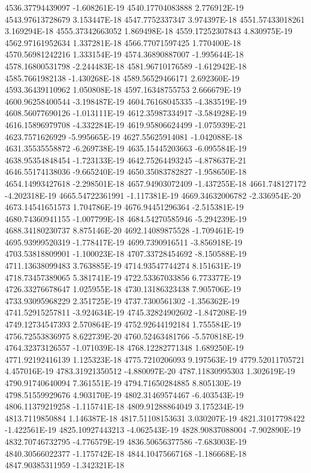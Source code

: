 4536.37794439097  -1.608261E-19
4540.17704083888  2.776912E-19
4543.97613728679  3.153447E-18
4547.7752337347  3.974397E-18
4551.57433018261  3.169294E-18
4555.37342663052  1.869498E-18
4559.17252307843  4.830975E-19
4562.97161952634  1.337281E-18
4566.77071597425  1.770400E-18
4570.56981242216  1.333154E-19
4574.36890887007  -1.995644E-18
4578.16800531798  -2.244483E-18
4581.96710176589  -1.612942E-18
4585.7661982138  -1.430268E-18
4589.56529466171  2.692360E-19
4593.36439110962  1.050808E-18
4597.16348755753  2.666679E-19
4600.96258400544  -3.198487E-19
4604.76168045335  -4.383519E-19
4608.56077690126  -1.013111E-19
4612.35987334917  -3.584928E-19
4616.15896979708  -4.332284E-19
4619.95806624499  -1.075939E-21
4623.7571626929  -5.995665E-19
4627.55625914081  -1.042088E-18
4631.35535558872  -6.269738E-19
4635.15445203663  -6.095584E-19
4638.95354848454  -1.723133E-19
4642.75264493245  -4.878637E-21
4646.55174138036  -9.665240E-19
4650.35083782827  -1.958650E-18
4654.14993427618  -2.298501E-18
4657.94903072409  -1.437255E-18
4661.748127172  -4.202318E-19
4665.54722361991  -1.117381E-19
4669.34632006782  -2.336954E-20
4673.14541651573  1.704786E-19
4676.94451296364  -2.515381E-19
4680.74360941155  -1.007799E-18
4684.54270585946  -5.294239E-19
4688.34180230737  8.875146E-20
4692.14089875528  -1.709461E-19
4695.93999520319  -1.778417E-19
4699.7390916511  -3.856918E-19
4703.53818809901  -1.100023E-18
4707.33728454692  -8.150588E-19
4711.13638099483  3.763885E-19
4714.93547744274  8.151631E-19
4718.73457389065  5.381741E-19
4722.53367033856  6.773377E-19
4726.33276678647  1.025955E-18
4730.13186323438  7.905706E-19
4733.93095968229  2.351725E-19
4737.7300561302  -1.356362E-19
4741.52915257811  -3.924634E-19
4745.32824902602  -1.847208E-19
4749.12734547393  2.570864E-19
4752.92644192184  1.755584E-19
4756.72553836975  8.622739E-20
4760.52463481766  -5.570818E-19
4764.32373126557  -1.071039E-18
4768.12282771348  1.689250E-19
4771.92192416139  1.125323E-18
4775.7210206093  9.197563E-19
4779.52011705721  4.457016E-19
4783.31921350512  -4.880097E-20
4787.11830995303  1.302619E-19
4790.91740640094  7.361551E-19
4794.71650284885  8.805130E-19
4798.51559929676  4.903170E-19
4802.31469574467  -6.403543E-19
4806.11379219258  -1.115741E-18
4809.91288864049  3.175234E-19
4813.7119850884  1.146387E-18
4817.51108153631  3.030207E-19
4821.31017798422  -1.422561E-19
4825.10927443213  -4.062543E-19
4828.90837088004  -7.902890E-19
4832.70746732795  -4.776579E-19
4836.50656377586  -7.683003E-19
4840.30566022377  -1.175742E-18
4844.10475667168  -1.186668E-18
4847.90385311959  -1.342321E-18
